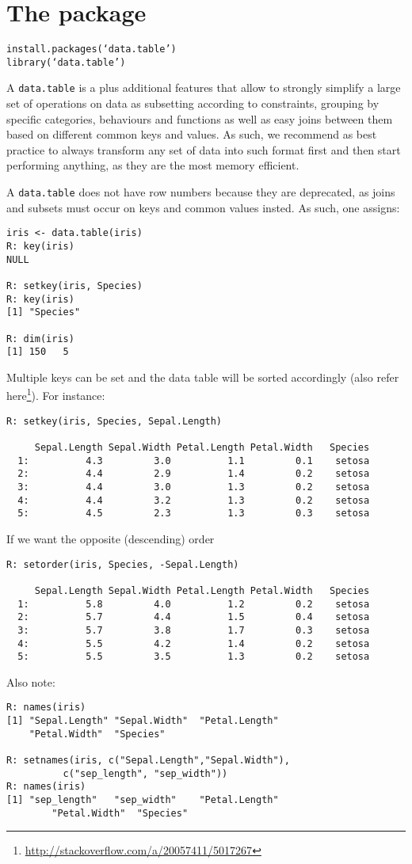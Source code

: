 \chapter{The  package}\label{sec: datatable}
\texttt{install.packages(`data.table')}\\
\texttt{library(`data.table')}
\bigskip 

A \texttt{data.table} is a \df plus
additional features that allow to strongly simplify
a large set of operations on data as subsetting 
according to constraints, grouping by specific
categories, behaviours and functions as well as
easy joins between them based on different 
common keys and values. As such, we recommend as
best practice to always transform any set of data
into such format first and then start performing
anything, as they are the most memory efficient.
\bigskip 

A \texttt{data.table} does not have row numbers
because they are deprecated, as joins and subsets
must occur on keys and common values insted.
As such, one assigns:
\begin{verbatim}
iris <- data.table(iris)
R: key(iris)
NULL

R: setkey(iris, Species)
R: key(iris)
[1] "Species"

R: dim(iris)
[1] 150   5
\end{verbatim}
Multiple keys can be set and the data table 
will be sorted accordingly (also refer 
here\footnote{ 
\url{http://stackoverflow.com/a/20057411/5017267}
}). For instance:
\begin{verbatim}
R: setkey(iris, Species, Sepal.Length) 

     Sepal.Length Sepal.Width Petal.Length Petal.Width   Species
  1:          4.3         3.0          1.1         0.1    setosa
  2:          4.4         2.9          1.4         0.2    setosa
  3:          4.4         3.0          1.3         0.2    setosa
  4:          4.4         3.2          1.3         0.2    setosa
  5:          4.5         2.3          1.3         0.3    setosa
\end{verbatim}
If we want the opposite (descending) order
\begin{verbatim}
R: setorder(iris, Species, -Sepal.Length)

     Sepal.Length Sepal.Width Petal.Length Petal.Width   Species
  1:          5.8         4.0          1.2         0.2    setosa
  2:          5.7         4.4          1.5         0.4    setosa
  3:          5.7         3.8          1.7         0.3    setosa
  4:          5.5         4.2          1.4         0.2    setosa
  5:          5.5         3.5          1.3         0.2    setosa
\end{verbatim}
Also note:
\begin{verbatim}
R: names(iris)
[1] "Sepal.Length" "Sepal.Width"  "Petal.Length" 
	"Petal.Width"  "Species"

R: setnames(iris, c("Sepal.Length","Sepal.Width"), 
		  c("sep_length", "sep_width"))
R: names(iris)
[1] "sep_length"   "sep_width"    "Petal.Length" 
		"Petal.Width"  "Species" 
\end{verbatim}

